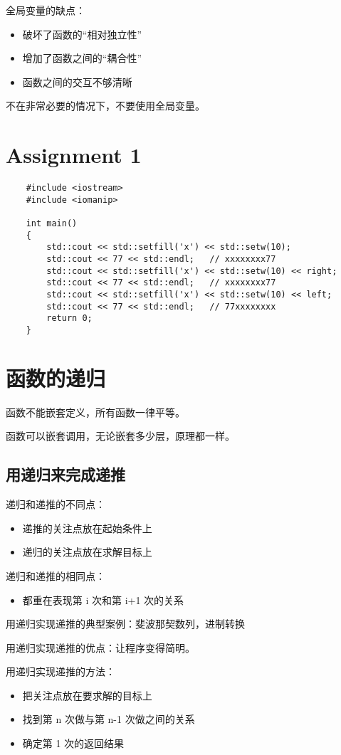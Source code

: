 \documentclass[UTF8]{ctexart}
\begin{document}
全局变量的缺点：
\begin{itemize}
    \item 破坏了函数的“相对独立性”
    \item 增加了函数之间的“耦合性”
    \item 函数之间的交互不够清晰
\end{itemize}

不在非常必要的情况下，不要使用全局变量。

\section{Assignment 1}
\begin{verbatim}
    #include <iostream>
    #include <iomanip>

    int main()
    {
        std::cout << std::setfill('x') << std::setw(10);
        std::cout << 77 << std::endl;   // xxxxxxxx77
        std::cout << std::setfill('x') << std::setw(10) << right;
        std::cout << 77 << std::endl;   // xxxxxxxx77
        std::cout << std::setfill('x') << std::setw(10) << left;
        std::cout << 77 << std::endl;   // 77xxxxxxxx
        return 0;
    }
\end{verbatim}

\section{函数的递归}
函数不能嵌套定义，所有函数一律平等。

函数可以嵌套调用，无论嵌套多少层，原理都一样。

\subsection{用递归来完成递推}
递归和递推的不同点：
\begin{itemize}
    \item 递推的关注点放在起始条件上
    \item 递归的关注点放在求解目标上
\end{itemize}

递归和递推的相同点：
\begin{itemize}
    \item 都重在表现第 i 次和第 i+1 次的关系
\end{itemize}

用递归实现递推的典型案例：斐波那契数列，进制转换

用递归实现递推的优点：让程序变得简明。

用递归实现递推的方法：
\begin{itemize}
    \item 把关注点放在要求解的目标上
    \item 找到第 n 次做与第 n-1 次做之间的关系
    \item 确定第 1 次的返回结果
\end{itemize}
\end{document}

